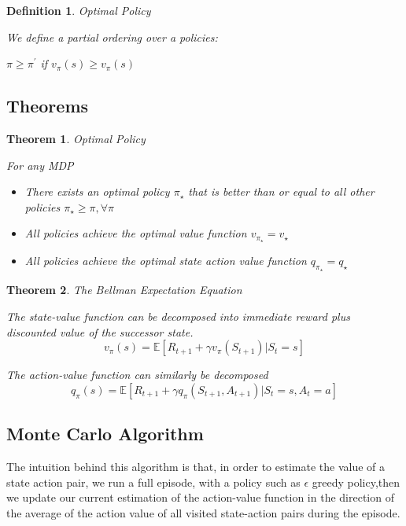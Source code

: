\documentclass[12pt,a4paper]{article}
\newtheorem{definition}{Definition}
\newtheorem{theorem}{Theorem}
\begin{document}
\begin{definition}{Optimal Policy}

We define a partial ordering over a policies:

$\pi \geq \pi^{\prime}$ if $v_{\pi}(s) \geq  v_{\pi}(s)$

\end{definition}

\subsection{Theorems}

\begin{theorem}{Optimal Policy}
	
For any MDP
\begin{itemize}
\item There exists an optimal policy $\pi_{\star}$ that is better than or equal to all other policies $\pi_{\star} \geq \pi,\forall\pi $
\item All policies achieve the optimal value function $v_{\pi_{\star}} = v_{\star}$
\item All policies achieve the optimal state action value function $q_{\pi_{\star}} = q_{\star}$
\end{itemize}
\end{theorem}

\begin{theorem}{The Bellman Expectation Equation}

The state-value function can be decomposed into immediate reward plus discounted value of the successor state.
\[ 
v_{\pi}(s) = \mathbb{E}[R_{t+1} + \gamma v_{\pi}(S_{t+1})  \vert S_{t}=s]
\]

The action-value function can similarly be decomposed
\[ 
q_{\pi}(s) = \mathbb{E}[R_{t+1} + \gamma q_{\pi}(S_{t+1}, A_{t+1}) \vert S_{t}=s, A_{t}=a]
\]


\end{theorem}

\subsection{Monte Carlo Algorithm}

The intuition behind this algorithm is that, in order to estimate the value of a state action pair, we run a full episode, with a policy such as $\epsilon$ greedy policy,then we update our current estimation of the action-value function in the direction of the average of the action value of all visited state-action pairs during the episode.
\end{document}
